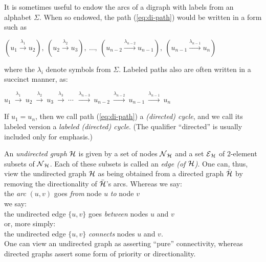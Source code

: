 \medskip

It is sometimes useful to endow the arcs of a digraph with labels from
an alphabet $\Sigma$.  When so endowed, the path (\ref{eq:di-path})
would be written in a form such as

\smallskip

\hspace*{.35in}$\displaystyle
(u_1 \stackrel{\lambda_1}{\rightarrow} u_2), \ 
(u_2 \stackrel{\lambda_2}{\rightarrow} u_3), \ \ldots, \ 
(u_{n-2} \stackrel{\lambda_{n-2}}{\rightarrow} u_{n-1}), \ 
(u_{n-1} \stackrel{\lambda_{n-1}}{\rightarrow} u_n)$

\smallskip

\noindent
where the $\lambda_i$ denote symbols from $\Sigma$.  Labeled paths
also are often written in a succinct manner, as:

\smallskip

\hspace*{.35in}$\displaystyle 
u_1 \ \stackrel{\lambda_1}{\rightarrow} \ u_2
    \ \stackrel{\lambda_2}{\rightarrow} \ u_3
    \ \stackrel{\lambda_3}{\rightarrow} \ \cdots \ 
    \ \stackrel{\lambda_{n-3}}{\rightarrow} \ u_{n-2}
    \ \stackrel{\lambda_{n-2}}{\rightarrow} \ u_{n-1}
    \  \stackrel{\lambda_{n-1}}{\rightarrow} \ u_n$

\medskip

If $u_1 = u_n$, then we call path (\ref{eq:di-path}) a {\em (directed)
  cycle}, and we call its labeled version
a {\em labeled (directed) cycle}.  (The qualifier ``directed'' is
usually included only for emphasis.)

\medskip

An {\em undirected graph} $\mbox{$\cal H$}$ is given by a set of nodes $\mbox{$\cal N$}_{\mbox{{\scriptsize $\cal H$}}}$
and a set $\mbox{$\cal E$}_{\mbox{{\scriptsize $\cal H$}}}$ 
of $2$-element subsets of $\mbox{$\cal N$}_{\mbox{{\scriptsize $\cal H$}}}$.  Each of these subsets is called
an {\it edge (of $\mbox{$\cal H$}$)}.
\index{graphs!edge} 
One can, thus, view the undirected graph $\mbox{$\cal H$}$ as being obtained from a
directed graph $\bar{\mbox{$\cal H$}}$ by removing the directionality of
$\bar{\mbox{$\cal H$}}$'s arcs.  Whereas we say: \\
\hspace*{.35in}the {\em arc} $(u,v)$ goes {\em from} node $u$ {\em to}
node $v$ \\
we say: \\
\hspace*{.35in}the undirected edge $\{u,v\}$ goes {\em between} nodes
$u$ and $v$ \\
or, more simply: \\
\hspace*{.35in}the undirected edge $\{u,v\}$ {\em connects} nodes $u$
and $v$.  \\
One can view an undirected graph as asserting ``pure'' connectivity,
whereas directed graphs assert some form of priority or
directionality.

